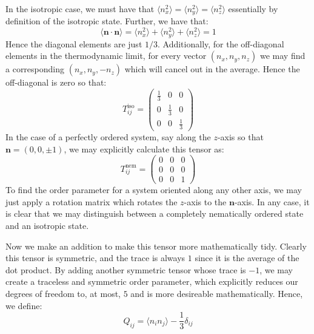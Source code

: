 \documentclass[reqno]{article}
\begin{document}
  In the isotropic case, we must have that $\langle n_x^2 \rangle = \langle
  n_y^2 \rangle = \langle n_z^2 \rangle$ essentially by definition of the
  isotropic state.
  Further, we have that:
  \begin{equation}
    \langle \mathbf{n} \cdot \mathbf{n} \rangle
    = \langle n_x^2 \rangle + \langle n_y^2 \rangle + \langle n_z^2 \rangle
    = 1
  \end{equation}
  Hence the diagonal elements are just $1/3$.
  Additionally, for the off-diagonal elements in the thermodynamic limit, for
  every vector $(n_x, n_y, n_z)$ we may find a corresponding $(n_x, n_y, -n_z)$
  which will cancel out in the average.
  Hence the off-diagonal is zero so that:
  \begin{equation}
    T^\text{iso}_{ij}
    =
    \begin{pmatrix}
      \frac13 &0 &0 \\
      0 &\tfrac13 &0 \\
      0 &0 &\tfrac13
    \end{pmatrix}
  \end{equation}
  In the case of a perfectly ordered system, say along the $z$-axis so that
  $\mathbf{n} = (0, 0, \pm 1)$, we may explicitly calculate this tensor as:
  \begin{equation}
    T^\text{nem}_{ij}
    =
    \begin{pmatrix}
      0 &0 &0 \\
      0 &0 &0 \\
      0 &0 &1
    \end{pmatrix}
  \end{equation}
  To find the order parameter for a system oriented along any other axis, we may
  just apply a rotation matrix which rotates the $z$-axis to the
  $\mathbf{n}$-axis.
  In any case, it is clear that we may distinguish between a completely
  nematically ordered state and an isotropic state.

  Now we make an addition to make this tensor more mathematically tidy.
  Clearly this tensor is symmetric, and the trace is always $1$ since it is the
  average of the dot product.
  By adding another symmetric tensor whose trace is $-1$, we may create a
  traceless and symmetric order parameter, which explicitly reduces our degrees
  of freedom to, at most, $5$ and is more desireable mathematically.
  Hence, we define:
  \begin{equation} \label{eq:Q-def}
    Q_{ij} = \langle n_i n_j \rangle - \frac13 \delta_{ij}
  \end{equation}
\end{document}
